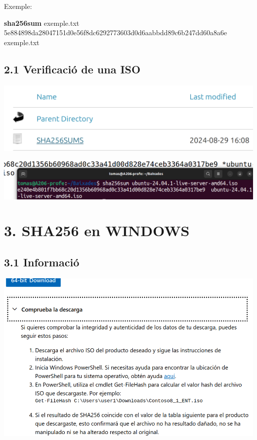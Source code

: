 \documentclass[
  12 pt,
  a4paper,
]{article}
\newenvironment{Shaded}{\begin{snugshade}}{\end{snugshade}}
\newcommand{\ExtensionTok}[1]{#1}
\newcommand{\FunctionTok}[1]{\textcolor[rgb]{0.13,0.29,0.53}{\textbf{#1}}}
\newcommand{\NormalTok}[1]{#1}
\begin{document}
Exemple:

\begin{Shaded}
\begin{Highlighting}[]
\FunctionTok{sha256sum}\NormalTok{ exemple.txt}
\ExtensionTok{5e884898da28047151d0e56f8dc6292773603d0d6aabbdd89c6b247dd60a8a6e}\NormalTok{  exemple.txt}
\end{Highlighting}
\end{Shaded}

\subsection{2.1 Verificació de una ISO}\label{verificaciuxf3-de-una-iso}

\includegraphics{png/sha256-1.png}

\includegraphics{png/sha256-2.png}

\section{3. SHA256 en WINDOWS}\label{sha256-en-windows}

\subsection{3.1 Informació}\label{informaciuxf3}

\includegraphics{png/sha256Windows-1.png}
\end{document}

